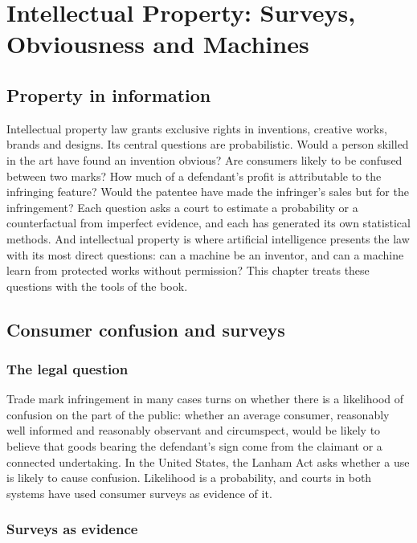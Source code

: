 \chapter{Intellectual Property: Surveys, Obviousness and Machines}
\label{ch:ip}

\section{Property in information}

Intellectual property law grants exclusive rights in inventions, creative works, brands and designs. Its central questions are probabilistic. Would a person skilled in the art have found an invention obvious? Are consumers likely to be confused between two marks? How much of a defendant's profit is attributable to the infringing feature? Would the patentee have made the infringer's sales but for the infringement? Each question asks a court to estimate a probability or a counterfactual from imperfect evidence, and each has generated its own statistical methods. And intellectual property is where artificial intelligence presents the law with its most direct questions: can a machine be an inventor, and can a machine learn from protected works without permission? This chapter treats these questions with the tools of the book.

\section{Consumer confusion and surveys}

\subsection{The legal question}

Trade mark infringement in many cases turns on whether there is a likelihood of confusion on the part of the public: whether an average consumer, reasonably well informed and reasonably observant and circumspect, would be likely to believe that goods bearing the defendant's sign come from the claimant or a connected undertaking. In the United States, the Lanham Act asks whether a use is likely to cause confusion. Likelihood is a probability, and courts in both systems have used consumer surveys as evidence of it.

\subsection{Surveys as evidence}

